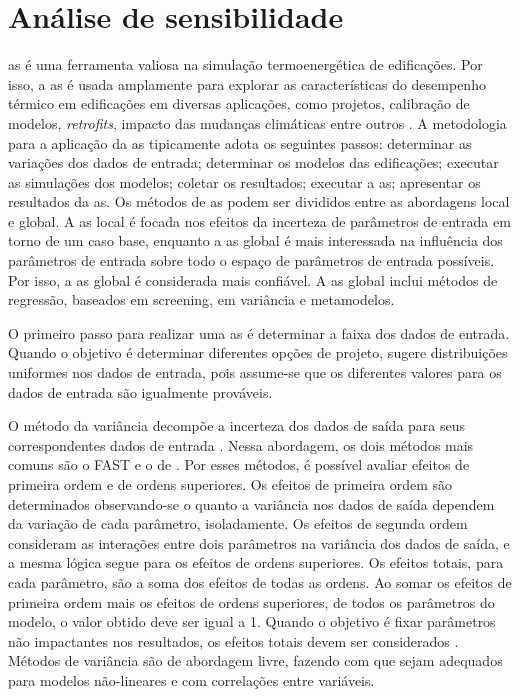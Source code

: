 \documentclass[brazil,hardcopy,openany]{ufscthesis} %
\begin{document}
\section{Análise de sensibilidade}

\Acrfull{as} é uma ferramenta valiosa na simulação termoenergética de edificações. Por isso, a \acrshort{as} é usada amplamente para explorar as características do desempenho térmico em edificações em diversas aplicações, como projetos, calibração de modelos, \textit{retrofits}, impacto das mudanças climáticas entre outros \cite{Tian2013a}. A metodologia para a aplicação da \acrshort{as} tipicamente adota os seguintes passos: determinar as variações dos dados de entrada; determinar os modelos das edificações; executar as simulações dos modelos; coletar os resultados; executar a \acrshort{as}; apresentar os resultados da \acrshort{as}. Os métodos de \acrshort{as} podem ser divididos entre as abordagens local e global. A \acrshort{as} local é focada nos efeitos da incerteza de parâmetros de entrada em torno de um caso base, enquanto a \acrshort{as} global é mais interessada na influência dos parâmetros de entrada sobre todo o espaço de parâmetros de entrada possíveis. Por isso, a \acrshort{as} global é considerada mais confiável. A \acrshort{as} global inclui métodos de regressão, baseados em screening, em variância e metamodelos.

O primeiro passo para realizar uma \acrshort{as} é determinar a faixa dos dados de entrada. Quando o objetivo é determinar diferentes opções de projeto,   sugere distribuições uniformes nos dados de entrada, pois assume-se que os diferentes valores para os dados de entrada são igualmente prováveis.

O método da variância decompõe a incerteza dos dados de saída para seus correspondentes dados de entrada  \cite{Tian2013a}. Nessa abordagem, os dois métodos mais comuns são o FAST \cite{Saltelli2004} e o de . 
Por esses métodos, é possível avaliar efeitos de primeira ordem e de ordens superiores.
Os efeitos de primeira ordem são determinados observando-se o quanto a variância nos dados de saída dependem da variação de cada parâmetro, isoladamente.
Os efeitos de segunda ordem consideram as interações entre dois parâmetros na variância dos dados de saída, e a mesma lógica segue para os efeitos de ordens superiores.
Os efeitos totais, para cada parâmetro, são a soma dos efeitos de todas as ordens.
Ao somar os efeitos de primeira ordem mais os efeitos de ordens superiores, de todos os parâmetros do modelo, o valor obtido deve ser igual a 1.
Quando o objetivo é fixar parâmetros não impactantes nos resultados, os efeitos totais devem ser considerados \cite{Saltelli2004}. Métodos de variância são de abordagem livre, fazendo com que sejam adequados para modelos não-lineares e com correlações entre variáveis.
\end{document}
